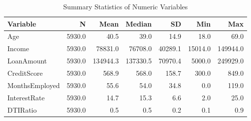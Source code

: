 \begin{table}[H]
\caption{Summary Statistics of Numeric Variables}
\label{Table 2:summary_stats}
\begin{tabular}{lrrrrrr}
\toprule
Variable & N & Mean & Median & SD & Min & Max \\
\midrule
Age & 5930.0 & 40.5 & 39.0 & 14.9 & 18.0 & 69.0 \\
Income & 5930.0 & 78831.0 & 76708.0 & 40289.1 & 15014.0 & 149944.0 \\
LoanAmount & 5930.0 & 134944.3 & 137330.5 & 70970.4 & 5000.0 & 249929.0 \\
CreditScore & 5930.0 & 568.9 & 568.0 & 158.7 & 300.0 & 849.0 \\
MonthsEmployed & 5930.0 & 55.6 & 54.0 & 34.8 & 0.0 & 119.0 \\
InterestRate & 5930.0 & 14.7 & 15.3 & 6.6 & 2.0 & 25.0 \\
DTIRatio & 5930.0 & 0.5 & 0.5 & 0.2 & 0.1 & 0.9 \\
\bottomrule
\end{tabular}
\end{table}
